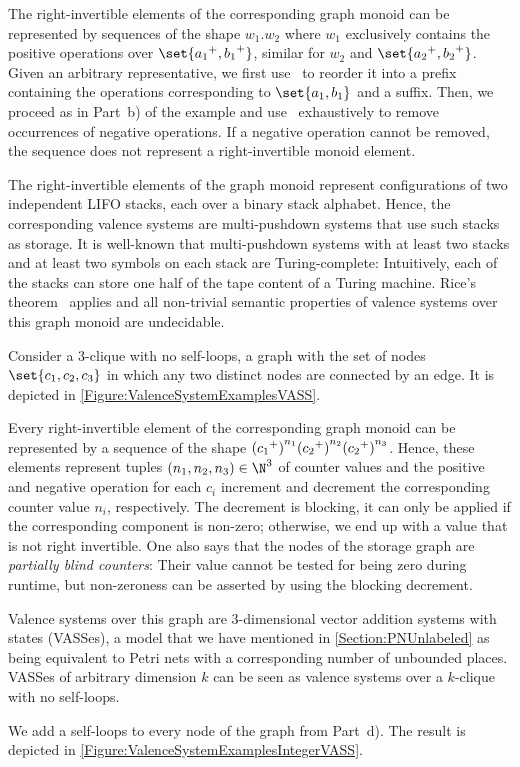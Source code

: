\documentclass[../../diss.tex]{subfiles}
\begin{document}
\begin{example}
\begin{thmenumerate}[a)]
            The right-invertible elements of the corresponding graph monoid can be represented by sequences of the shape $w_1.w_2$ where $w_1$ exclusively contains the positive operations over $\set{\inc{a_1}, \inc{b_1}}$, similar for $w_2$ and $\set{\inc{a_2}, \inc{b_2}}$.
            Given an arbitrary representative, we first use \RuleSwap~to reorder it into a prefix containing the operations corresponding to $\set{a_1,b_1}$ and a suffix.
            Then, we proceed as in Part~b) of the example and use \RuleSwap~exhaustively to remove occurrences of negative operations.
            If a negative operation cannot be removed, the sequence does not represent a right-invertible monoid element.

            The right-invertible elements of the graph monoid represent configurations of two independent LIFO stacks, each over a binary stack alphabet.
            Hence, the corresponding valence systems are multi-pushdown systems that use such stacks as storage.
            It is well-known that multi-pushdown systems with at least two stacks and at least two symbols on each stack are Turing-complete:
            Intuitively, each of the stacks can store one half of the tape content of a Turing machine.
            Rice's theorem~\cite{Rice53} applies and all non-trivial semantic properties of valence systems over this graph monoid are undecidable.
        \item
            Consider a 3-clique with no self-loops, \ie a graph with the set of nodes $\set{c_1,c_2,c_3}$ in which any two distinct nodes are connected by an edge.
            It is depicted in \cref{Figure:ValenceSystemExamplesVASS}.

            Every right-invertible element of the corresponding graph monoid can be represented by a sequence of the shape ${({c_1}^+)}^{n_1}{({c_2}^+)}^{n_2}{({c_2}^+)}^{n_3}$.
            Hence, these elements represent tuples $(n_1,n_2,n_3) \in \N^3$ of counter values and the positive and negative operation for each $c_i$ increment and decrement the corresponding counter value $n_i$, respectively.
            The decrement is blocking, it can only be applied if the corresponding component is non-zero; otherwise, we end up with a value that is not right invertible.
            One also says that the nodes of the storage graph are \emph{partially blind counters}:
            Their value cannot be tested for being zero during runtime, but non-zeroness can be asserted by using the blocking decrement.

            Valence systems over this graph are $3$-dimensional vector addition systems with states (VASSes), a model that we have mentioned in \cref{Section:PNUnlabeled} as being equivalent to Petri nets with a corresponding number of unbounded places.
            VASSes of arbitrary dimension $k$ can be seen as valence systems over a $k$-clique with no self-loops.
        \item
            We add a self-loops to every node of the graph from Part~d).
            The result is depicted in \cref{Figure:ValenceSystemExamplesIntegerVASS}.


\end{thmenumerate}
\end{example}
\end{document}
